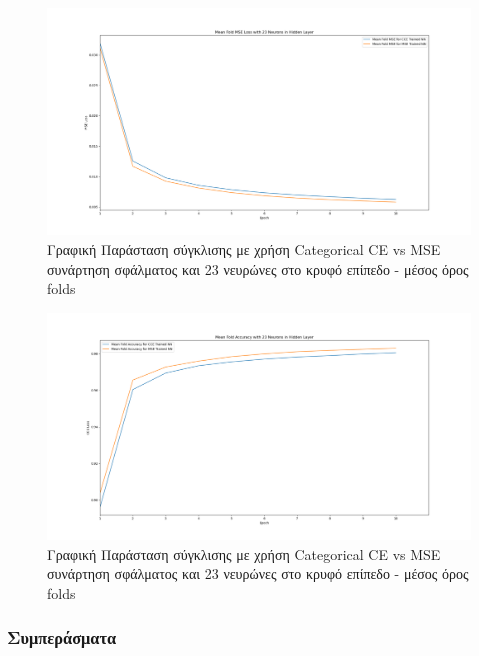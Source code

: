 \documentclass[12pt,a4paper]{article}
\begin{document}
\begin{figure}[H]
	\includegraphics[width=\textwidth]{17. CCE vs MSE - MSE Loss - 23 Neurons - Mean.png}
	\caption{Γραφική Παράσταση σύγκλισης με χρήση Categorical CE vs MSE συνάρτηση σφάλματος και 23 νευρώνες στο κρυφό επίπεδο - μέσος όρος folds}
\end{figure}

\begin{figure}[H]
	\includegraphics[width=\textwidth]{18. CCE vs MSE - Accuracy - 23 Neurons - Mean.png}
	\caption{Γραφική Παράσταση σύγκλισης με χρήση Categorical CE vs MSE συνάρτηση σφάλματος και 23 νευρώνες στο κρυφό επίπεδο - μέσος όρος folds}
\end{figure}

\subsubsection{Συμπεράσματα}
\end{document}
